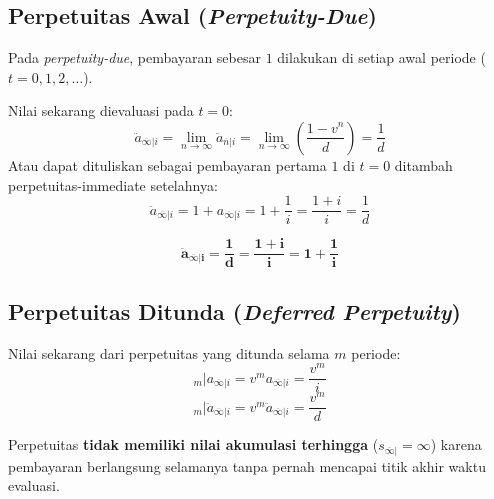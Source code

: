 \documentclass[11pt,a4paper]{article}
\begin{document}
\subsection{Perpetuitas Awal (\textit{Perpetuity-Due})}

Pada \textit{perpetuity-due}, pembayaran sebesar $1$ dilakukan di setiap awal periode ($t = 0, 1, 2, \dots$).

Nilai sekarang dievaluasi pada $t = 0$:
\begin{equation}
    \ddot{a}_{\overline{\infty}|i} = \lim_{n \to \infty} \ddot{a}_{\overline{n}|i} = \lim_{n \to \infty} \left( \frac{1 - v^n}{d} \right) = \frac{1}{d}
\end{equation}
Atau dapat dituliskan sebagai pembayaran pertama $1$ di $t = 0$ ditambah perpetuitas-immediate setelahnya:
\begin{equation}
    \ddot{a}_{\overline{\infty}|i} = 1 + a_{\overline{\infty}|i} = 1 + \frac{1}{i} = \frac{1+i}{i} = \frac{1}{d}
\end{equation}

\begin{definitionbox}
\begin{equation}
    \mathbf{\ddot{a}_{\overline{\infty}|i} = \frac{1}{d} = \frac{1+i}{i} = 1 + \frac{1}{i}}
\end{equation}
\end{definitionbox}

\subsection{Perpetuitas Ditunda (\textit{Deferred Perpetuity})}

Nilai sekarang dari perpetuitas yang ditunda selama $m$ periode:
\begin{equation}
    {}_m| a_{\overline{\infty}|i} = v^m a_{\overline{\infty}|i} = \frac{v^m}{i}
\end{equation}
\begin{equation}
    {}_m| \ddot{a}_{\overline{\infty}|i} = v^m \ddot{a}_{\overline{\infty}|i} = \frac{v^m}{d}
\end{equation}

\begin{notebox}
Perpetuitas \textbf{tidak memiliki nilai akumulasi terhingga} ($s_{\overline{\infty}|} = \infty$) karena pembayaran berlangsung selamanya tanpa pernah mencapai titik akhir waktu evaluasi.
\end{notebox}
\end{document}
